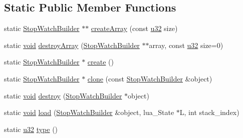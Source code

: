 \subsection*{Static Public Member Functions}
\begin{DoxyCompactItemize}
\item 
static \mbox{\hyperlink{classnjli_1_1_stop_watch_builder}{Stop\+Watch\+Builder}} $\ast$$\ast$ \mbox{\hyperlink{classnjli_1_1_stop_watch_builder_a3e543a079e8abb2c0b92b6b088e74049}{create\+Array}} (const \mbox{\hyperlink{_util_8h_a10e94b422ef0c20dcdec20d31a1f5049}{u32}} size)
\item 
static \mbox{\hyperlink{_thread_8h_af1e856da2e658414cb2456cb6f7ebc66}{void}} \mbox{\hyperlink{classnjli_1_1_stop_watch_builder_a0c128e2e33b479212c00e15620755e0f}{destroy\+Array}} (\mbox{\hyperlink{classnjli_1_1_stop_watch_builder}{Stop\+Watch\+Builder}} $\ast$$\ast$array, const \mbox{\hyperlink{_util_8h_a10e94b422ef0c20dcdec20d31a1f5049}{u32}} size=0)
\item 
static \mbox{\hyperlink{classnjli_1_1_stop_watch_builder}{Stop\+Watch\+Builder}} $\ast$ \mbox{\hyperlink{classnjli_1_1_stop_watch_builder_a40572c1eb3a01561754a0df0174a57b6}{create}} ()
\item 
static \mbox{\hyperlink{classnjli_1_1_stop_watch_builder}{Stop\+Watch\+Builder}} $\ast$ \mbox{\hyperlink{classnjli_1_1_stop_watch_builder_a8185811ff452b95bd4e21e38a820c9b5}{clone}} (const \mbox{\hyperlink{classnjli_1_1_stop_watch_builder}{Stop\+Watch\+Builder}} \&object)
\item 
static \mbox{\hyperlink{_thread_8h_af1e856da2e658414cb2456cb6f7ebc66}{void}} \mbox{\hyperlink{classnjli_1_1_stop_watch_builder_a78ee75c8ee0f8318eb12e20263549e76}{destroy}} (\mbox{\hyperlink{classnjli_1_1_stop_watch_builder}{Stop\+Watch\+Builder}} $\ast$object)
\item 
static \mbox{\hyperlink{_thread_8h_af1e856da2e658414cb2456cb6f7ebc66}{void}} \mbox{\hyperlink{classnjli_1_1_stop_watch_builder_acc218740a6af51fc7e288e4928492773}{load}} (\mbox{\hyperlink{classnjli_1_1_stop_watch_builder}{Stop\+Watch\+Builder}} \&object, lua\+\_\+\+State $\ast$L, int stack\+\_\+index)
\item 
static \mbox{\hyperlink{_util_8h_a10e94b422ef0c20dcdec20d31a1f5049}{u32}} \mbox{\hyperlink{classnjli_1_1_stop_watch_builder_ada9b01fe52740d133e80132cc492828f}{type}} ()
\end{DoxyCompactItemize}

